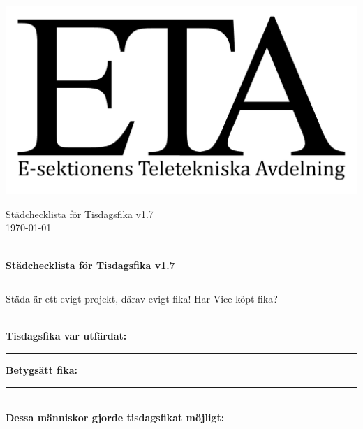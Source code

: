 \documentclass[a4paper, 12pt]{article}
\newcommand{\version}{v1.7} %
\newcommand{\titel}{Städchecklista för Tisdagsfika \version} %
\newcommand{\stadrad}{\makebox[\textwidth]{\hspace{5pt}\hrulefill\hspace{5pt}\hrulefill\hspace{5pt}\hrulefill\hspace{5pt}}}
\newcommand{\stadare}{\vspace{20pt} \stadrad}
\begin{document}
\titlespacing{\subsection}{0pt}{\parskip}{-\parskip}
\titlespacing{\subsubsection}{0pt}{\parskip}{-\parskip}
\begin{minipage}{0pt}

\includegraphics[scale = 2]{ETA-logga.png}
\end{minipage}%
\hfill
\begin{minipage}{0.5\textwidth}
\flushright
\vspace{-3.5\baselineskip}
\titel\\
\today
\flushleft
\end{minipage}%
\\
{\LARGE \textbf{\titel}}         %
\newline
\noindent\rule{\textwidth}{1pt}                  %
Städa är ett evigt projekt, därav evigt fika! Har Vice köpt fika?

\\
\centering
\textbf{Tisdagsfika var utfärdat:}\rule{3cm}{1pt} \textbf{Betygsätt fika:}\rule{3cm}{1pt}\\
\textbf{Dessa människor gjorde tisdagsfikat möjligt:}\\
\stadare
\stadare
\stadare
\stadare
\stadare
\end{document}
